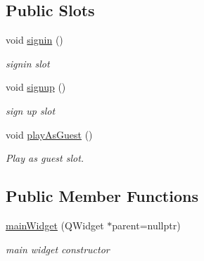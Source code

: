 \subsection*{Public Slots}
\begin{DoxyCompactItemize}
\item 
void \hyperlink{classmainWidget_a18a889384066a82c65b71cd9d26a4dcb}{signin} ()
\begin{DoxyCompactList}\small\item\em signin slot \end{DoxyCompactList}\item 
void \hyperlink{classmainWidget_a90ca9a99780c436835324252d7b97fb8}{signup} ()
\begin{DoxyCompactList}\small\item\em sign up slot \end{DoxyCompactList}\item 
void \hyperlink{classmainWidget_afc358112a27702edf74ff89cc485a8d1}{play\+As\+Guest} ()
\begin{DoxyCompactList}\small\item\em Play as guest slot. \end{DoxyCompactList}\end{DoxyCompactItemize}
\subsection*{Public Member Functions}
\begin{DoxyCompactItemize}
\item 
\hyperlink{classmainWidget_ad73a469a876f7642f125c2e114fde3b6}{main\+Widget} (Q\+Widget $\ast$parent=nullptr)
\begin{DoxyCompactList}\small\item\em main widget constructor \end{DoxyCompactList}\end{DoxyCompactItemize}
